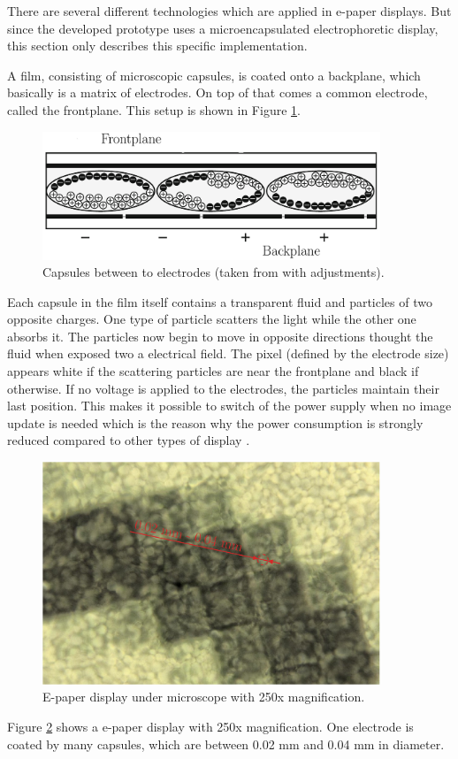 There are several different technologies which are applied in e-paper displays.
But since the developed prototype uses a microencapsulated electrophoretic display, this section only describes this specific implementation.

A film, consisting of microscopic capsules, is coated onto a backplane, which basically is a matrix of electrodes.
On top of that comes a common electrode, called the frontplane.
This setup is shown in Figure \ref{theory:capsules}.

\begin{figure}[H]
	\centering
	\includegraphics[width=0.9\textwidth]{2-theory/e-paper-display/graphics/capsules.pdf}
	\caption{Capsules between to electrodes (taken from \cite{amundson} with adjustments).\label{theory:capsules}}
\end{figure}

Each capsule in the film itself contains a transparent fluid and particles of two opposite charges.
One type of particle scatters the light while the other one absorbs it.
The particles now begin to move in opposite directions thought the fluid when exposed two a electrical field. 
The pixel (defined by the electrode size) appears white if the scattering particles are near the frontplane and black if otherwise.
If no voltage is applied to the electrodes, the particles maintain their last position.
This makes it possible to switch of the power supply when no image update is needed which is the reason why the power consumption is strongly reduced compared to other types of display \cite{amundson}.

\begin{figure}[H]
	\centering
	\includegraphics[width=0.9\textwidth]{2-theory/e-paper-display/graphics/epaper_mikroskop.pdf}
	\caption{E-paper display under microscope with 250x magnification.\label{theory:micro}}
\end{figure}

Figure \ref{theory:micro} shows a e-paper display with 250x magnification.
One electrode is coated by many capsules, which are between 0.02 mm and 0.04 mm in diameter.